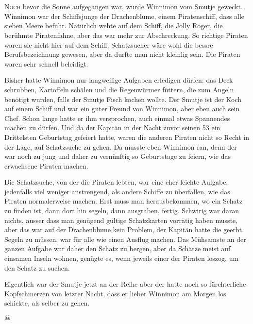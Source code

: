 \chapter*{}
\lettrine[lines=3]{\color{red}N}{och} bevor die Sonne aufgegangen war, wurde Winnimon vom Smutje geweckt. Winnimon war der Schiffsjunge der Drachenblume, einem Piratenschiff, dass alle sieben Meere befuhr. Natürlich wehte auf dem Schiff, die Jolly Roger, die berühmte Piratenfahne, aber das war mehr zur Abschreckung. So richtige Piraten waren sie nicht hier auf dem Schiff. Schatzsucher wäre wohl die bessre Berufsbezeichnung gewesen, aber da durfte man nicht kleinlig sein. Die Piraten waren sehr schnell beleidigt.

Bisher hatte Winnimon nur langweilige Aufgaben erledigen dürfen: das Deck schrubben, Kartoffeln schälen und die Regenwürmer füttern, die zum Angeln benötigt wurden, falls der Smutje Fisch kochen wollte. Der Smutje ist der Koch auf einem Schiff und war ein guter Freund von Winnimon, aber eben auch sein Chef. Schon lange hatte er ihm versprochen, auch einmal etwas Spannendes machen zu dürfen. Und da der Kapitän in der Nacht zuvor seinen 53 ein Drittelsten Geburtstag gefeiert hatte, waren die anderen Piraten nicht so Recht in der Lage, auf Schatzsuche zu gehen. Da musste eben Winnimon ran, denn der war noch zu jung und daher zu vernünftig so Geburtstage zu feiern, wie das erwachsene Piraten machen.

Die Schatzsuche, von der die Piraten lebten, war eine eher leichte Aufgabe, jedenfalls viel weniger anstrengend, als andere Schiffe zu überfallen, wie das Piraten normalerweise machen. Erst muss man herausbekommen, wo ein Schatz zu finden ist, dann dort hin segeln, dann ausgraben, fertig. Schwirig war daran nichts, ausser dass man genügend gültige Schatzkarten vorrätig haben musste, aber das war auf der Drachenblume kein Problem, der Kapitän hatte die geerbt. Segeln zu müssen, war für alle wie einen Ausflug machen. Das Mühsamste an der ganzen Aufgabe war daher den Schatz zu bergen, aber da Schätze meist auf einsamen Inseln wohnen, genügte es, wenn jeweils einer der Piraten loszog, um den Schatz zu suchen.

Eigentlich war der Smutje jetzt an der Reihe aber der hatte noch so fürchterliche Kopfschmerzen von letzter Nacht, dass er lieber Winnimon am Morgen los schickte, als selber zu gehen.

\begin{center}
{ $\skull$}
\end{center}

